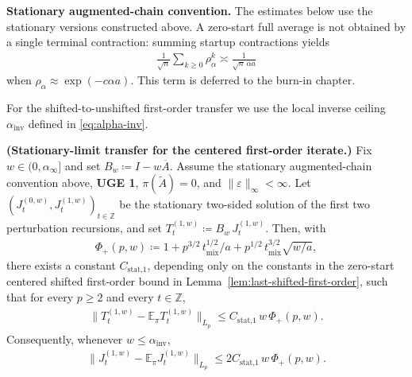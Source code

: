 \textbf{Stationary augmented-chain convention.} The estimates below use the stationary
versions constructed above. A zero-start full average is not obtained by a
single terminal contraction: summing startup contractions yields
\begin{equation}
\begin{aligned}
\frac{1}{\sqrt{n}} \sum_{k \ge 0} \rho_\alpha^k
  \asymp \frac{1}{\sqrt{n} \, \alpha a}
\end{aligned}
\end{equation}
when \(\rho_\alpha \approx \exp(-c \alpha a)\). This term is deferred to the burn-in
chapter.

For the shifted-to-unshifted first-order transfer we use the local inverse
ceiling \(\alpha_{\text{inv}}\) defined in \eqref{eq:alpha-inv}.

\begin{lemma}\label{lem:stationary-limit-J1}
  \textbf{(Stationary-limit transfer for the centered first-order iterate.)}
  Fix \(w \in (0, \alpha_\infty]\) and set \(B_w \coloneqq I - w \overline{A}\). Assume
  the stationary augmented-chain convention above, \textbf{UGE 1},
  \(\pi(\widetilde{A}) = 0\), and \(\lVert  \varepsilon  \rVert_\infty < \infty\). Let
  \((J_t^{(0, w)}, J_t^{(1, w)})_{t \in \mathbb{Z}}\) be the stationary two-sided
  solution of the first two perturbation recursions, and set
  \(T_t^{(1, w)} \coloneqq B_w \, J_t^{(1, w)}\). Then, with
\begin{equation}
\begin{aligned}
  \Phi_+(p, w) \coloneqq 1 + p^{3 / 2} \, t_{\text{mix}}^{1 / 2} / a
               + p^{1 / 2} \, t_{\text{mix}}^{3 / 2} \sqrt{w / a},
\end{aligned}
\end{equation}
  there exists a constant \(C_{\text{stat,1}}\), depending only on the constants in
  the zero-start centered shifted first-order bound in Lemma~\ref{lem:last-shifted-first-order},
  such that
  for every \(p \ge 2\) and every \(t \in \mathbb{Z}\),
\begin{equation}
\begin{aligned}
  \lVert  T_t^{(1, w)} - \mathbb{E}_\pi T_t^{(1, w)}  \rVert_{L_p}
    \le C_{\text{stat,1}} \, w \, \Phi_+(p, w).
\end{aligned}
\end{equation}
  Consequently, whenever \(w \le \alpha_{\text{inv}}\),
\begin{equation}
\begin{aligned}
  \lVert  J_t^{(1, w)} - \mathbb{E}_\pi J_t^{(1, w)}  \rVert_{L_p}
    \le 2 C_{\text{stat,1}} \, w \, \Phi_+(p, w).
\end{aligned}
\end{equation}
\end{lemma}


